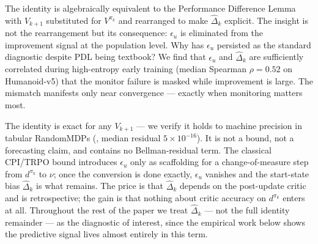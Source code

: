 \documentclass{article}
\begin{document}
The identity is algebraically equivalent to the Performance Difference Lemma \citep{kakade2002approximately} with $V_{k+1}$ substituted for $V^{\pi_k}$ and rearranged to make $\hat\Delta_k$ explicit. The insight is not the rearrangement but its consequence: $\epsilon_u$ is eliminated from the improvement signal at the population level. Why has $\epsilon_u$ persisted as the standard diagnostic despite PDL being textbook? We find that $\epsilon_u$ and $\hat\Delta_k$ are sufficiently correlated during high-entropy early training (median Spearman $\rho=0.52$ on Humanoid-v5) that the monitor failure is masked while improvement is large. The mismatch manifests only near convergence --- exactly when monitoring matters most.

The identity is exact for any $V_{k+1}$ --- we verify it holds to machine precision in tabular RandomMDPs (, median residual $5{\times}10^{-16}$). It is not a bound, not a forecasting claim, and contains no Bellman-residual term. The classical CPI/TRPO bound \citep{kakade2002approximately,schulman2015trust} introduces $\epsilon_u$ only as scaffolding for a change-of-measure step from $d^{\pi_k}$ to $\nu$; once the conversion is done exactly, $\epsilon_u$ vanishes and the start-state bias $\hat\Delta_k$ is what remains. The price is that $\hat\Delta_k$ depends on the post-update critic and is retrospective; the gain is that nothing about critic accuracy on $d^{\pi_k}$ enters at all. Throughout the rest of the paper we treat $\hat\Delta_k$ --- not the full identity remainder --- as the diagnostic of interest, since the empirical work below shows the predictive signal lives almost entirely in this term.
\end{document}
